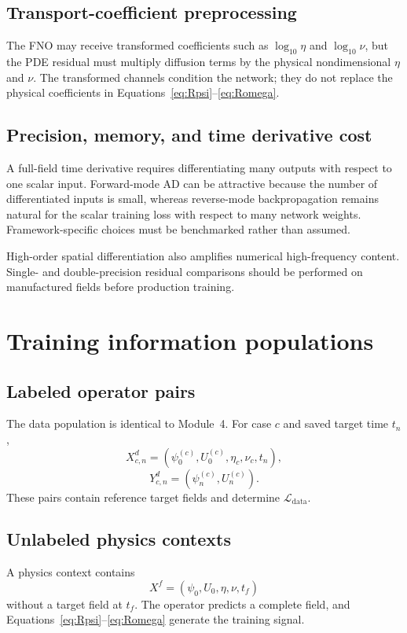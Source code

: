 \documentclass[11pt]{article}
\newcommand{\Ldata}{\mathcal{L}_{\mathrm{data}}}
\begin{document}
\subsection{Transport-coefficient preprocessing}
The FNO may receive transformed coefficients such as $\log_{10}\eta$ and $\log_{10}\nu$, but the PDE residual must multiply diffusion terms by the physical nondimensional $\eta$ and $\nu$. The transformed channels condition the network; they do not replace the physical coefficients in Equations~\eqref{eq:Rpsi}--\eqref{eq:Romega}.

\subsection{Precision, memory, and time derivative cost}
A full-field time derivative requires differentiating many outputs with respect to one scalar input. Forward-mode AD can be attractive because the number of differentiated inputs is small, whereas reverse-mode backpropagation remains natural for the scalar training loss with respect to many network weights. Framework-specific choices must be benchmarked rather than assumed.

High-order spatial differentiation also amplifies numerical high-frequency content. Single- and double-precision residual comparisons should be performed on manufactured fields before production training.

\section{Training information populations}
\label{sec:populations}

\subsection{Labeled operator pairs}
The data population is identical to Module~4. For case $c$ and saved target time $t_n$,
\begin{equation}
X^d_{c,n}=(\psi_0^{(c)},U_0^{(c)},\eta_c,\nu_c,t_n),
\end{equation}
\begin{equation}
Y^d_{c,n}=(\psi_n^{(c)},U_n^{(c)}).
\end{equation}
These pairs contain reference target fields and determine $\Ldata$.

\subsection{Unlabeled physics contexts}
A physics context contains
\begin{equation}
X^f=(\psi_0,U_0,\eta,\nu,t_f)
\end{equation}
without a target field at $t_f$. The operator predicts a complete field, and Equations~\eqref{eq:Rpsi}--\eqref{eq:Romega} generate the training signal.
\end{document}
